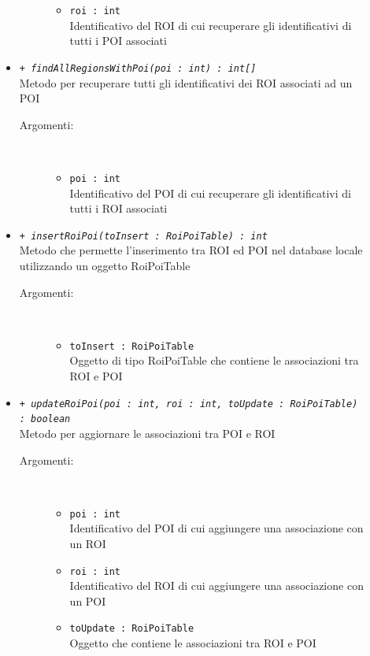 \documentclass[../DefinizioneDiProdotto.tex]{subfiles}
\begin{document}
\begin{description}
\begin{itemize}
\begin{description}
\begin{itemize}
\item \texttt{roi : int}\\
Identificativo del ROI di cui recuperare gli identificativi di tutti i POI associati\end{itemize}
\end{description}
\item \texttt{+ \textit{findAllRegionsWithPoi(poi : int) : int[]}}\\
Metodo per recuperare tutti gli identificativi dei ROI associati ad un POI 
 \begin{description}
\item[Argomenti:] \
\begin{itemize}
\item \texttt{poi : int}\\
Identificativo del POI di cui recuperare gli identificativi di tutti i ROI associati\end{itemize}
\end{description}
\item \texttt{+ \textit{insertRoiPoi(toInsert : RoiPoiTable) : int}}\\
Metodo che permette l'inserimento tra ROI ed POI nel database locale utilizzando un oggetto RoiPoiTable
 \begin{description}
\item[Argomenti:] \
\begin{itemize}
\item \texttt{toInsert : RoiPoiTable}\\
Oggetto di tipo RoiPoiTable che contiene le associazioni tra ROI e POI\end{itemize}
\end{description}
\item \texttt{+ \textit{updateRoiPoi(poi : int, roi : int, toUpdate : RoiPoiTable) : boolean}}\\
Metodo per aggiornare le associazioni tra POI e ROI
 \begin{description}
\item[Argomenti:] \
\begin{itemize}
\item \texttt{poi : int}\\
Identificativo del POI di cui aggiungere una associazione con un ROI\item \texttt{roi : int}\\
Identificativo del ROI di cui aggiungere una associazione con un POI\item \texttt{toUpdate : RoiPoiTable}\\
Oggetto che contiene le associazioni tra ROI e POI\end{itemize}
\end{description}
\end{itemize}
\end{description}
\end{document}
